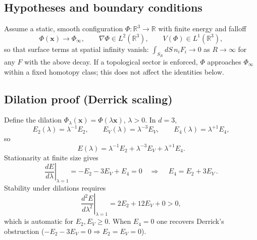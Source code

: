 \documentclass{article}
\begin{document}
\subsection{Hypotheses and boundary conditions}
\label{app:BCs}
Assume a static, smooth configuration $\Phi:\mathbb{R}^3\!\to\!\mathbb{R}$ with finite energy and falloff
\begin{equation}
\Phi(\mathbf{x})\to \Phi_\infty,\qquad 
\nabla\Phi\in L^2(\mathbb{R}^3),\qquad 
V(\Phi)\in L^1(\mathbb{R}^3),
\label{eq:falloff}
\end{equation}
so that surface terms at spatial infinity vanish:
\(\displaystyle \int_{S_R} dS\, n_i F_i \to 0\) as \(R\to\infty\) for any $F$ with the above decay.
If a topological sector is enforced, $\Phi$ approaches $\Phi_\infty$ within a fixed homotopy class; this does not affect the identities below.

\subsection{Dilation proof (Derrick scaling)}
\label{app:derrick}
Define the dilation $\Phi_\lambda(\mathbf{x})=\Phi(\lambda\mathbf{x})$, $\lambda>0$. In $d\!=\!3$,
\begin{equation}
E_2(\lambda)=\lambda^{-1}E_2,\qquad
E_V(\lambda)=\lambda^{-3}E_V,\qquad
E_4(\lambda)=\lambda^{+1}E_4,
\label{eq:scales-app}
\end{equation}
so
\begin{equation}
E(\lambda)=\lambda^{-1}E_2+\lambda^{-3}E_V+\lambda^{+1}E_4.
\label{eq:E-lambda-app}
\end{equation}
Stationarity at finite size gives
\begin{equation}
\left.\frac{dE}{d\lambda}\right|_{\lambda=1}=-E_2-3E_V+E_4=0
\quad\Longrightarrow\quad
\boxed{\,E_4=E_2+3E_V\,}.
\label{eq:virial-balance-app}
\end{equation}
Stability under dilations requires
\begin{equation}
\left.\frac{d^2E}{d\lambda^2}\right|_{\lambda=1}=2E_2+12E_V+0>0,
\label{eq:d2E}
\end{equation}
which is automatic for $E_2,E_V\ge 0$. When $E_4=0$ one recovers Derrick’s obstruction ($-E_2-3E_V=0\Rightarrow E_2=E_V=0$).
\end{document}
